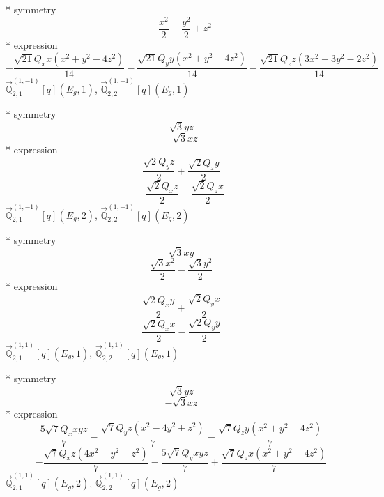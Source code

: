 \documentclass[fleqn,8pt]{jsarticle}
\begin{document}
\noindent\quad ** symmetry
\begin{dmath*}
- \frac{x^{2}}{2} - \frac{y^{2}}{2} + z^{2}
\end{dmath*}
\noindent\quad ** expression
\begin{dmath*}
- \frac{\sqrt{21} Q_{x} x \left(x^{2} + y^{2} - 4 z^{2}\right)}{14} - \frac{\sqrt{21} Q_{y} y \left(x^{2} + y^{2} - 4 z^{2}\right)}{14} - \frac{\sqrt{21} Q_{z} z \left(3 x^{2} + 3 y^{2} - 2 z^{2}\right)}{14}
\end{dmath*}
\noindent\quad $\vec{\mathbb{Q}}_{2,1}^{(1,-1)}[q](E_{g},1)$, $\vec{\mathbb{Q}}_{2,2}^{(1,-1)}[q](E_{g},1)$

\noindent\quad ** symmetry
\begin{dmath*}
\sqrt{3} y z
\end{dmath*}
\begin{dmath*}
- \sqrt{3} x z
\end{dmath*}
\noindent\quad ** expression
\begin{dmath*}
\frac{\sqrt{2} Q_{y} z}{2} + \frac{\sqrt{2} Q_{z} y}{2}
\end{dmath*}
\begin{dmath*}
- \frac{\sqrt{2} Q_{x} z}{2} - \frac{\sqrt{2} Q_{z} x}{2}
\end{dmath*}
\noindent\quad $\vec{\mathbb{Q}}_{2,1}^{(1,-1)}[q](E_{g},2)$, $\vec{\mathbb{Q}}_{2,2}^{(1,-1)}[q](E_{g},2)$

\noindent\quad ** symmetry
\begin{dmath*}
\sqrt{3} x y
\end{dmath*}
\begin{dmath*}
\frac{\sqrt{3} x^{2}}{2} - \frac{\sqrt{3} y^{2}}{2}
\end{dmath*}
\noindent\quad ** expression
\begin{dmath*}
\frac{\sqrt{2} Q_{x} y}{2} + \frac{\sqrt{2} Q_{y} x}{2}
\end{dmath*}
\begin{dmath*}
\frac{\sqrt{2} Q_{x} x}{2} - \frac{\sqrt{2} Q_{y} y}{2}
\end{dmath*}
\noindent\quad $\vec{\mathbb{Q}}_{2,1}^{(1,1)}[q](E_{g},1)$, $\vec{\mathbb{Q}}_{2,2}^{(1,1)}[q](E_{g},1)$

\noindent\quad ** symmetry
\begin{dmath*}
\sqrt{3} y z
\end{dmath*}
\begin{dmath*}
- \sqrt{3} x z
\end{dmath*}
\noindent\quad ** expression
\begin{dmath*}
\frac{5 \sqrt{7} Q_{x} x y z}{7} - \frac{\sqrt{7} Q_{y} z \left(x^{2} - 4 y^{2} + z^{2}\right)}{7} - \frac{\sqrt{7} Q_{z} y \left(x^{2} + y^{2} - 4 z^{2}\right)}{7}
\end{dmath*}
\begin{dmath*}
- \frac{\sqrt{7} Q_{x} z \left(4 x^{2} - y^{2} - z^{2}\right)}{7} - \frac{5 \sqrt{7} Q_{y} x y z}{7} + \frac{\sqrt{7} Q_{z} x \left(x^{2} + y^{2} - 4 z^{2}\right)}{7}
\end{dmath*}
\noindent\quad $\vec{\mathbb{Q}}_{2,1}^{(1,1)}[q](E_{g},2)$, $\vec{\mathbb{Q}}_{2,2}^{(1,1)}[q](E_{g},2)$
\end{document}
